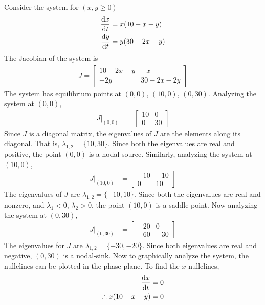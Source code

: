 \documentclass[12pt,1in]{article}
\newenvironment{Example}[2][Example]{\begin{trivlist}
		\item[\hskip \labelsep {\bfseries #1}\hskip \labelsep {\bfseries #2.}]}{\end{trivlist}}
\begin{document}
\begin{Example}{1} \cite[p.~488]{diff_eq}
	Consider the system for $(x,y \geq 0)$
	\begin{align*}
    \derivative{x}{t} &= x(10 - x - y) \\
    \derivative{y}{t} &= y(30 - 2x - y)
\end{align*}
The Jacobian of the system is 
\begin{align*}
    J = \begin{bmatrix}
    10 - 2x - y & -x \\
    -2y & 30 - 2x - 2y
    \end{bmatrix}
\end{align*}
The system has equilibrium points at $(0,0)$, $(10,0)$, $(0,30)$. Analyzing the system at $(0,0)$,
\begin{align*}
    J|_{(0,0)} &= \begin{bmatrix}
    10 & 0 \\
    0 & 30
    \end{bmatrix}
\end{align*}
Since $J$ is a diagonal matrix, the eigenvalues of $J$ are the elements along its diagonal. That is, $\lambda_{1,2} = \{ 10, 30 \}$. Since both the eigenvalues are real and positive, the point $(0,0)$ is a nodal-source.
Similarly, analyzing the system at $(10,0)$,
\begin{align*}
    J|_{(10,0)} &= 
    \begin{bmatrix}
    -10 & -10\\
    0 & 10 
    \end{bmatrix}
\end{align*}
The eigenvalues of $J$ are $\lambda_{1,2} = \{-10, 10\}$. Since both the eigenvalues are real and nonzero, and $\lambda_1 < 0$, $\lambda_2 > 0$, the point $(10,0)$ is a saddle point. 
Now analyzing the system at $(0,30)$,
\begin{align*}
J|_{(0,30)} &= \begin{bmatrix}
-20 & 0 \\
-60 & -30 
\end{bmatrix}
\end{align*}
The eigenvalues for $J$ are $\lambda_{1,2} = \{-30, -20\}$. Since both eigenvalues are real and negative, $(0,30)$ is a nodal-sink. 
Now to graphically analyze the system, the nullclines can be plotted in the phase plane.
To find the $x$-nullclines,
\begin{align*}
\derivative{x}{t} &= 0\\
\therefore x(10 - x -y) &= 0

\end{align*}
\end{Example}
\end{document}
